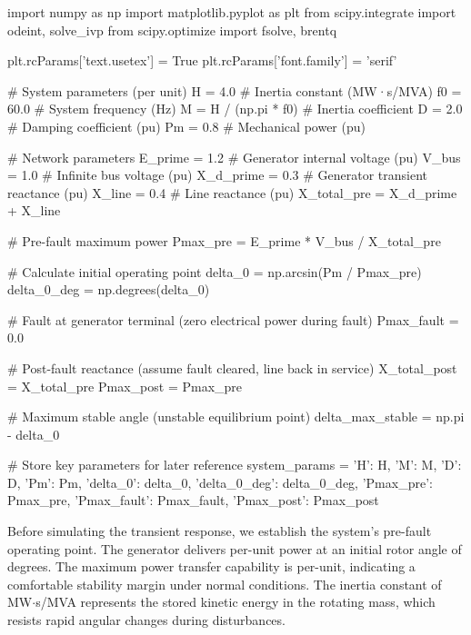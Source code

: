 \documentclass[11pt,a4paper]{article}
\begin{document}
\begin{pycode}
import numpy as np
import matplotlib.pyplot as plt
from scipy.integrate import odeint, solve_ivp
from scipy.optimize import fsolve, brentq

plt.rcParams['text.usetex'] = True
plt.rcParams['font.family'] = 'serif'

# System parameters (per unit)
H = 4.0              # Inertia constant (MW·s/MVA)
f0 = 60.0            # System frequency (Hz)
M = H / (np.pi * f0) # Inertia coefficient
D = 2.0              # Damping coefficient (pu)
Pm = 0.8             # Mechanical power (pu)

# Network parameters
E_prime = 1.2        # Generator internal voltage (pu)
V_bus = 1.0          # Infinite bus voltage (pu)
X_d_prime = 0.3      # Generator transient reactance (pu)
X_line = 0.4         # Line reactance (pu)
X_total_pre = X_d_prime + X_line

# Pre-fault maximum power
Pmax_pre = E_prime * V_bus / X_total_pre

# Calculate initial operating point
delta_0 = np.arcsin(Pm / Pmax_pre)
delta_0_deg = np.degrees(delta_0)

# Fault at generator terminal (zero electrical power during fault)
Pmax_fault = 0.0

# Post-fault reactance (assume fault cleared, line back in service)
X_total_post = X_total_pre
Pmax_post = Pmax_pre

# Maximum stable angle (unstable equilibrium point)
delta_max_stable = np.pi - delta_0

# Store key parameters for later reference
system_params = {
    'H': H,
    'M': M,
    'D': D,
    'Pm': Pm,
    'delta_0': delta_0,
    'delta_0_deg': delta_0_deg,
    'Pmax_pre': Pmax_pre,
    'Pmax_fault': Pmax_fault,
    'Pmax_post': Pmax_post
}
\end{pycode}

Before simulating the transient response, we establish the system's pre-fault operating point. The generator delivers  per-unit power at an initial rotor angle of  degrees. The maximum power transfer capability is  per-unit, indicating a comfortable stability margin under normal conditions. The inertia constant of  MW$\cdot$s/MVA represents the stored kinetic energy in the rotating mass, which resists rapid angular changes during disturbances.
\end{document}
